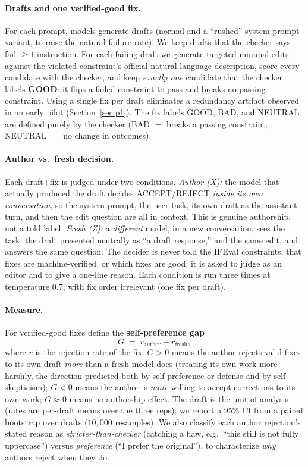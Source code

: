 \documentclass[11pt]{article}
\begin{document}
\paragraph{Drafts and one verified-good fix.} For each prompt, models generate drafts (normal
and a ``rushed'' system-prompt variant, to raise the natural failure rate). We keep drafts that
the checker says fail $\ge 1$ instruction. For each failing draft we generate targeted minimal
edits against the violated constraint's official natural-language description, score every
candidate with the checker, and keep \emph{exactly one} candidate that the checker labels
\textbf{GOOD}: it flips a failed constraint to pass and breaks no passing constraint. Using a
single fix per draft eliminates a redundancy artifact observed in an early pilot
(Section~\ref{sec:p1}). The fix labels GOOD, BAD, and NEUTRAL are defined purely by the checker
(BAD $=$ breaks a passing constraint; NEUTRAL $=$ no change in outcomes).

\paragraph{Author vs.\ fresh decision.} Each draft$+$fix is judged under two conditions.
\emph{Author (X):} the model that actually produced the draft decides ACCEPT/REJECT
\emph{inside its own conversation}, so the system prompt, the user task, its own draft as the
assistant turn, and then the edit question are all in context. This is genuine authorship, not
a told label. \emph{Fresh (Z):} a \emph{different} model, in a new conversation, sees the task,
the draft presented neutrally as ``a draft response,'' and the same edit, and answers the same
question. The decider is never told the IFEval constraints, that fixes are machine-verified, or
which fixes are good; it is asked to judge as an editor and to give a one-line reason. Each
condition is run three times at temperature $0.7$, with fix order irrelevant (one fix per
draft).

\paragraph{Measure.} For verified-good fixes define the \textbf{self-preference gap}
\[
G \;=\; r_{\text{author}} - r_{\text{fresh}},
\]
where $r$ is the rejection rate of the fix. $G>0$ means the author rejects valid fixes to its
own draft \emph{more} than a fresh model does (treating its own work more harshly, the
direction predicted both by self-preference or defense and by self-skepticism); $G<0$ means the
author is \emph{more} willing to accept corrections to its own work; $G\approx 0$ means no
authorship effect. The draft is the unit of analysis (rates are per-draft means over the three
reps); we report a 95\% CI from a paired bootstrap over drafts ($10{,}000$ resamples). We also
classify each author rejection's stated reason as \emph{stricter-than-checker} (catching a
flaw, e.g.\ ``this still is not fully uppercase'') versus \emph{preference} (``I prefer the
original''), to characterize \emph{why} authors reject when they do.
\end{document}
